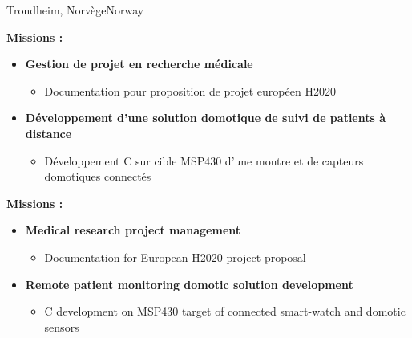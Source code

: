 {}{}{Trondheim, \ifnativelang Norv\`ege\else Norway\fi}{
\ifnativelang
	\textcolor{color1}{\textbf{Missions :}}
	\begin{itemize}
		\item \textbf{Gestion de projet en recherche m\'edicale}
		\begin{itemize}
			\item Documentation pour proposition de projet europ\'een H2020
		\end{itemize}
		\item \textbf{Développement d’une solution domotique de suivi de patients à distance}
		\begin{itemize}
			\item Développement C sur cible MSP430 d'une montre et de capteurs domotiques connect\'es
		\end{itemize}
	\end{itemize}
\else
	\textcolor{color1}{\textbf{Missions :}}
	\begin{itemize}
		\item \textbf{Medical research project management}
		\begin{itemize}
			\item Documentation for European H2020 project proposal
		\end{itemize}
		\item \textbf{Remote patient monitoring domotic solution development}
		\begin{itemize}
			\item C development on MSP430 target of connected smart-watch and domotic sensors
		\end{itemize}
	\end{itemize}
\fi
}


\vspace{\ItemsSpacing}

